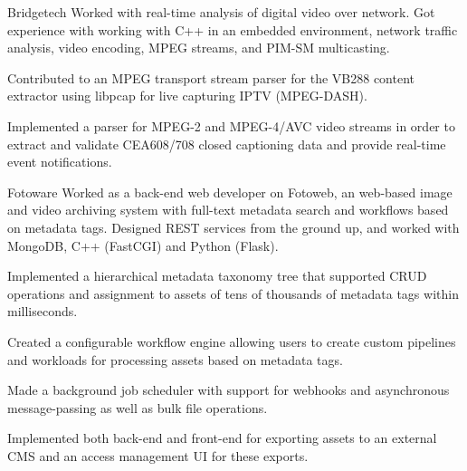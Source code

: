 \begin{experience}{Bridgetech}{
}
Worked with real-time analysis of digital video over network.
Got experience with working with C++ in an embedded environment, network traffic analysis, video encoding, MPEG streams, and PIM-SM multicasting.

\begin{contribs}
	\item{Contributed to an MPEG transport stream parser for the VB288 content extractor using libpcap for live capturing
		IPTV (MPEG-DASH).}
	\item{Implemented a parser for MPEG-2 and MPEG-4/AVC video streams in order to extract and
		validate CEA608/708 closed captioning data and provide real-time event
		notifications.}
\end{contribs}
\end{experience}

\begin{experience}[last]{Fotoware}{
}
Worked as a back-end web developer on Fotoweb, an web-based image and video
archiving system with full-text metadata search and workflows based on
metadata tags. %
Designed REST services from the ground up, and worked with MongoDB, C++ (FastCGI) and Python (Flask). %

\begin{contribs}
	\item{Implemented a hierarchical metadata taxonomy tree that
		supported CRUD operations and assignment to assets of tens of thousands of metadata tags within
		milliseconds.}
	\item{Created a configurable workflow engine allowing users to
		create custom pipelines and workloads for processing assets based on
		metadata tags.}
	\item{Made a background job scheduler with support for
		webhooks and asynchronous message-passing as well as
		bulk file operations.}
	\item{Implemented both back-end and front-end for exporting
		assets to an external CMS and an access 
		management UI for these exports.}
\end{contribs}
\end{experience}


